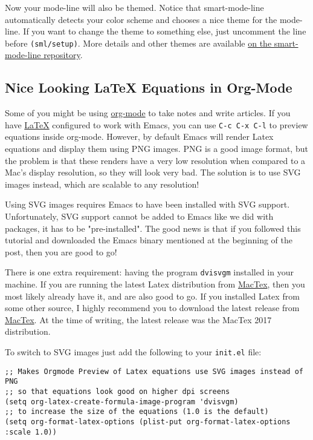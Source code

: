 \documentclass[12pt, a4paper]{article}
\begin{document}
Now your mode-line will also be themed. Notice that smart-mode-line automatically detects your color scheme and chooses a nice theme for the mode-line. If you want to change the theme to something else, just uncomment the line before \texttt{(sml/setup)}. More details and other themes are available \href{https://github.com/Malabarba/smart-mode-line\#installation}{on the smart-mode-line repository}.

\subsection{Nice Looking \LaTeX{} Equations in Org-Mode}
\label{sec:orgf3a0a87}

Some of you might be using \href{http://orgmode.org}{org-mode} to take notes and write articles. If you have \href{http://www.tug.org/mactex/}{\LaTeX{}} configured to work with Emacs, you can use \texttt{C-c C-x C-l} to preview equations inside org-mode. However, by default Emacs will render Latex equations and display them using PNG images. PNG is a good image format, but the problem is that these renders have a very low resolution when compared to a Mac's display resolution, so they will look very bad. The solution is to use SVG images instead, which are scalable to any resolution!

Using SVG images requires Emacs to have been installed with SVG support. Unfortunately, SVG support cannot be added to Emacs like we did with packages, it has to be "pre-installed". The good news is that if you followed this tutorial and downloaded the Emacs binary mentioned at the beginning of the post, then you are good to go!

There is one extra requirement: having the program \texttt{dvisvgm} installed in your machine. If you are running the latest Latex distribution from \href{http://www.tug.org/mactex/}{MacTex}, then you most likely already have it, and are also good to go. If you installed Latex from some other source, I highly recommend  you to download the latest release from \href{http://www.tug.org/mactex/}{MacTex}. At the time of writing, the latest release was the MacTex 2017 distribution.

To switch to SVG images just add the following to your \texttt{init.el} file:

\lstset{language=Lisp,label= ,caption= ,captionpos=b,numbers=none}
\begin{lstlisting}
;; Makes Orgmode Preview of Latex equations use SVG images instead of PNG
;; so that equations look good on higher dpi screens
(setq org-latex-create-formula-image-program 'dvisvgm)
;; to increase the size of the equations (1.0 is the default)
(setq org-format-latex-options (plist-put org-format-latex-options :scale 1.0))
\end{lstlisting}
\end{document}
